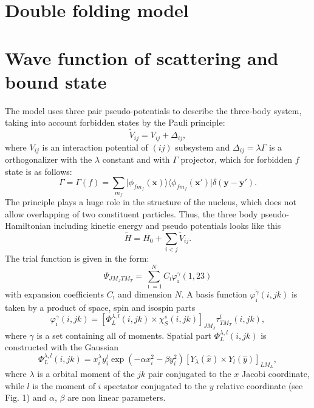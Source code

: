 \documentclass[
11pt, %
english, %
onehalfspacing, %
headsepline, %
]{MastersDoctoralThesis} %
\begin{document}
\section{Double folding model}
\section{Wave function of scattering and bound state}

The model \cite{Kukulin1977} uses three pair pseudo-potentials to describe the three-body system, taking into account forbidden states by the Pauli principle:
\begin{equation}
\label{pseudopot}
\widetilde{V}_{ij}=V_{ij}+\Delta_{ij},
\end{equation}
where $V_{ij}$ is  an interaction potential of $(ij)$ subsystem and $\Delta_{ij}=\lambda \Gamma$ is a orthogonalizer with the $\lambda$ constant and with $\Gamma$ projector, which  for  forbidden $f$ state is as follows:
\begin{equation}
\label{projector}
\Gamma=\Gamma(f)=\sum\limits_{m_f}\vert \phi_{fm_f} ({\mathbf x})\rangle \langle  \phi_{fm_f} ({\mathbf x'}) \vert \delta({\mathbf y - \mathbf y'}).
\end{equation}
The principle plays a huge role in the structure of the nucleus, which does not allow overlapping of two constituent particles. Thus, the three body pseudo-Hamiltonian including kinetic energy and pseudo potentials looks like this
\begin{equation}
\label{pseudohamiltonian}
\widetilde{H}=H_0+\sum_{i < j} \widetilde{V }_{ij}.
\end{equation}
The trial function is given in the form:
\begin{equation}
\Psi_{JM_J TM_T}=\sum_{\imath=1}^N C_{\imath} \varphi_{\imath}^{{\gamma}}(1,23)
\end{equation}
with expansion coefficients $C_{\imath}$ and  dimension $N$. A basis function $\varphi_{\imath}^{\widetilde{\gamma}}(i,jk)$ is taken by a product of space, spin and isospin parts
\begin{equation}
\label{basisfunction}
\varphi_{\imath}^{{\gamma}}(i,jk)=[   \Phi^{\lambda,l}_L(i,jk) \times \chi_S^s(i,jk)   ]_{JM_J} \tau^t_{TM_T}(i,jk),
\end{equation}
where ${{\gamma}}$ is a set containing all of moments. Spatial part $\Phi^{\lambda,l}_L(i,jk)$  is constructed with the Gaussian
\begin{equation}
\Phi^{\lambda,l}_L(i,jk)=x^{\lambda}_iy^{l}_i \exp(-\alpha x^2_i-\beta y^2_i)[Y_\lambda(\widehat{x}) \times Y_l(\widehat{y})]_{LM_L},
\end{equation} 
where $\lambda$ is a orbital moment of the $jk$ pair   conjugated to the $x$ Jacobi coordinate, while $l$ is the moment of  $i$ spectator conjugated to the $y$ relative coordinate (see Fig. 1) and $\alpha$, $\beta$ are non linear parameters.
\end{document}
